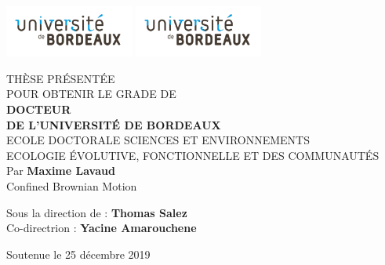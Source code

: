 \begin{titlepage}
\pagestyle{empty}
\includegraphics[scale=1, height=1.7cm]{01_head/images/brdx.pdf}
\hfill
\includegraphics[scale=1, height=1.7cm]{01_head/images/brdx.pdf}
\hfill
\begin{center}
\doublespacing
\begin{Large}

THÈSE PRÉSENTÉE\\ POUR OBTENIR LE GRADE DE \\
{\LARGE \textbf{DOCTEUR\\DE L'UNIVERSITÉ DE BORDEAUX} } \\
\vspace{0.40cm}
ECOLE DOCTORALE SCIENCES ET ENVIRONNEMENTS\\
{\normalsize ECOLOGIE ÉVOLUTIVE, FONCTIONNELLE ET DES COMMUNAUTÉS} \\
\vspace{0.40cm}
Par \textbf{Maxime Lavaud} \\
\vspace{0.40cm}
{\Large Confined Brownian Motion}
\end{Large}
\vspace{0.40cm}
\begin{normalsize}
\begin{singlespace}
Sous la direction de : \textbf{Thomas Salez}\\
Co-directrion : \textbf{Yacine Amarouchene}
\end{singlespace}
\end{normalsize}
\end{center}

{\large Soutenue le 25 décembre 2019 }\\


\end{titlepage}
